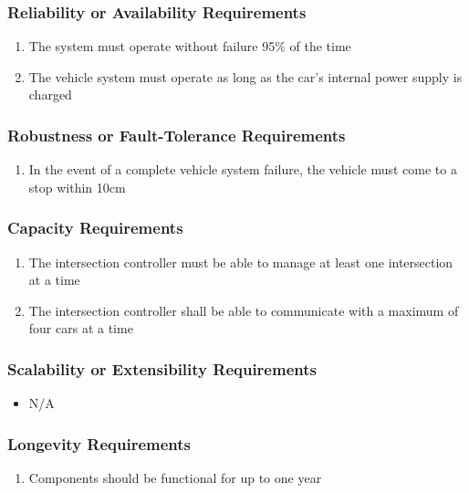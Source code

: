 \documentclass [11pt]{article}
\begin{document}
\subsubsection{Reliability or Availability  Requirements}
	\begin{enumerate}[label=\textbf{\Alph*}:]
		\item The system must operate without failure 95\% of the time
		\item The vehicle system must operate as long as the car's internal power supply is charged
	\end{enumerate}



\subsubsection{Robustness or Fault-Tolerance Requirements }
	\begin{enumerate}[label=\textbf{\Alph*}:]
		\item In the event of a complete vehicle system failure, the vehicle must come to a stop within 10cm
	\end{enumerate}
	
\subsubsection{Capacity Requirements }
	\begin{enumerate}[label=\textbf{\Alph*}:]
		\item The intersection controller must be able to manage at least one intersection at a time
		\item The intersection controller shall be able to communicate with a maximum of four cars at a time
	\end{enumerate}

\subsubsection{Scalability or Extensibility Requirements }
	\begin{itemize}
		\item N/A
	\end{itemize}
		
\subsubsection{Longevity Requirements }
	\begin{enumerate}[label=\textbf{\Alph*}:]
		\item Components should be functional for up to one year
	\end{enumerate}
\end{document}
